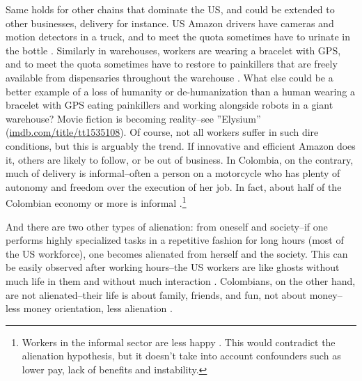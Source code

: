 \documentclass[10pt, letterpaper]{article}
\begin{document}
\begin{spacing}{2}
Same holds for other chains that dominate the US, and could be extended to other
businesses, delivery for instance. US Amazon drivers have cameras and motion
detectors in a truck, and to meet the quota sometimes  have to 
 urinate in the bottle \citep{moyerMISC21apr3}. Similarly in warehouses, workers are
wearing a bracelet with GPS, and to
meet the quota sometimes have to restore to painkillers that are freely
available from dispensaries throughout the warehouse \citep{streitfeldNYT15aug17,guendelsbergerBI19aug9}.
%
What else could be a better example of a loss of humanity or de-humanization than
a human wearing a bracelet with GPS eating painkillers and working alongside
robots in a giant warehouse? {Movie fiction is becoming
  reality--see ''Elysium'' (\url{imdb.com/title/tt1535108}).} 
%
 Of course, not all workers suffer in such dire
conditions, but this is arguably the trend. If innovative and  efficient Amazon does it, others
are likely to follow, or be out of business. %
In Colombia, on the contrary, much of delivery is informal--often a person on a
motorcycle who has plenty of autonomy and freedom over the execution of her job.
In fact, about half of the Colombian economy or more is informal %
 \citep[cited in][]{hurtado2016socioeconomic}.\footnote{%
  Workers in the informal sector are less happy
  \citep{hurtado2017hidden}. This would contradict the alienation hypothesis, but it
doesn't take into account confounders such as lower pay, lack of benefits and
instability.}

And there are two other types of alienation: from oneself and society--if one performs
highly specialized tasks in a repetitive fashion for long hours (most of the US workforce), one becomes alienated from herself and the society. This can be easily
observed after working hours--the US workers are like ghosts without much life
in them and without much interaction \citep{putnam01,duany01}.
Colombians, on the other hand, are not alienated--their life is about family, friends, and fun, not
about money--less money orientation, less alienation \citep{gssLonnieRubia}. 


\end{spacing}
\end{document}
